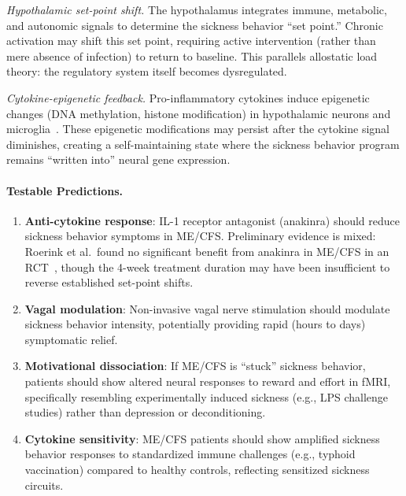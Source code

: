 \begin{speculation}
\textit{Hypothalamic set-point shift.} The hypothalamus integrates immune, metabolic, and autonomic signals to determine the sickness behavior ``set point.'' Chronic activation may shift this set point, requiring active intervention (rather than mere absence of infection) to return to baseline. This parallels allostatic load theory: the regulatory system itself becomes dysregulated.

\textit{Cytokine-epigenetic feedback.} Pro-inflammatory cytokines induce epigenetic changes (DNA methylation, histone modification) in hypothalamic neurons and microglia~\cite{Lasselin2021future}. These epigenetic modifications may persist after the cytokine signal diminishes, creating a self-maintaining state where the sickness behavior program remains ``written into'' neural gene expression.

\paragraph{Testable Predictions.}
\begin{enumerate}
    \item \textbf{Anti-cytokine response}: IL-1 receptor antagonist (anakinra) should reduce sickness behavior symptoms in ME/CFS. Preliminary evidence is mixed: Roerink et al.\ found no significant benefit from anakinra in ME/CFS in an RCT~\cite{Roerink2017anakinra}, though the 4-week treatment duration may have been insufficient to reverse established set-point shifts.
    \item \textbf{Vagal modulation}: Non-invasive vagal nerve stimulation should modulate sickness behavior intensity, potentially providing rapid (hours to days) symptomatic relief.
    \item \textbf{Motivational dissociation}: If ME/CFS is ``stuck'' sickness behavior, patients should show altered neural responses to reward and effort in fMRI, specifically resembling experimentally induced sickness (e.g., LPS challenge studies) rather than depression or deconditioning.
    \item \textbf{Cytokine sensitivity}: ME/CFS patients should show amplified sickness behavior responses to standardized immune challenges (e.g., typhoid vaccination) compared to healthy controls, reflecting sensitized sickness circuits.
\end{enumerate}


\end{speculation}
